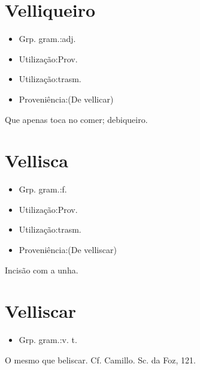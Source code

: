 \documentclass{article}
\begin{document}
\section{Velliqueiro}
\begin{itemize}
\item {Grp. gram.:adj.}
\end{itemize}
\begin{itemize}
\item {Utilização:Prov.}
\end{itemize}
\begin{itemize}
\item {Utilização:trasm.}
\end{itemize}
\begin{itemize}
\item {Proveniência:(De \textunderscore vellicar\textunderscore )}
\end{itemize}
Que apenas toca no comer; debiqueiro.
\section{Vellisca}
\begin{itemize}
\item {Grp. gram.:f.}
\end{itemize}
\begin{itemize}
\item {Utilização:Prov.}
\end{itemize}
\begin{itemize}
\item {Utilização:trasm.}
\end{itemize}
\begin{itemize}
\item {Proveniência:(De \textunderscore velliscar\textunderscore )}
\end{itemize}
Incisão com a unha.
\section{Velliscar}
\begin{itemize}
\item {Grp. gram.:v. t.}
\end{itemize}
O mesmo que \textunderscore beliscar\textunderscore . Cf. Camillo. \textunderscore Sc. da Foz\textunderscore , 121.
\end{document}
